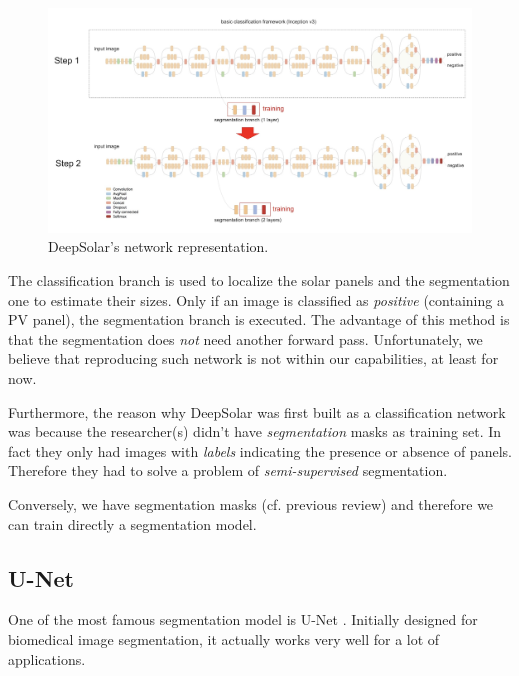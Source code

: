 \documentclass[a4paper, 12pt]{article}
\begin{document}
    \begin{figure}[h]
        \centering
        \includegraphics[width=\textwidth]{resources/jpg/cnn_arch.jpg}
        \caption{DeepSolar's network representation. \cite{yu2018deepsolar}}
    \end{figure}
    
    The classification branch is used to localize the solar panels and the segmentation one to estimate their sizes. Only if an image is classified as \emph{positive} (containing a PV panel), the segmentation branch is executed. The advantage of this method is that the segmentation does \emph{not} need another forward pass. Unfortunately, we believe that reproducing such network is not within our capabilities, at least for now.
    
    Furthermore, the reason why DeepSolar was first built as a classification network was because the researcher(s) didn't have \emph{segmentation} masks as training set. In fact they only had images with \emph{labels} indicating the presence or absence of panels. Therefore they had to solve a problem of \emph{semi-supervised} segmentation.
    
    Conversely, we have segmentation masks (cf. previous review) and therefore we can train directly a segmentation model.
    
    \subsection{U-Net}
    
    One of the most famous segmentation model is U-Net \cite{ronneberger2015u}. Initially designed for biomedical image segmentation, it actually works very well for a lot of applications.
    
\end{document}
